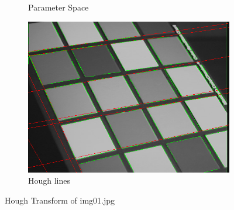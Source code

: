 \documentclass{article}
\begin{document}
\begin{figure}[htb!]
\begin{subfigure}[t]{0.3\textwidth}
			\caption{\label{fig:hough-01}Parameter Space}
		\end{subfigure}
		\hfill
		\begin{subfigure}[t]{0.3\textwidth}
			\centering
			\includegraphics[width=\textwidth]{img/line01.png}
			\caption{\label{fig:line-01}Hough lines}
		\end{subfigure}
		\caption{\label{fig:q3-1}Hough Transform of img01.jpg}
	\end{figure}
\end{document}
